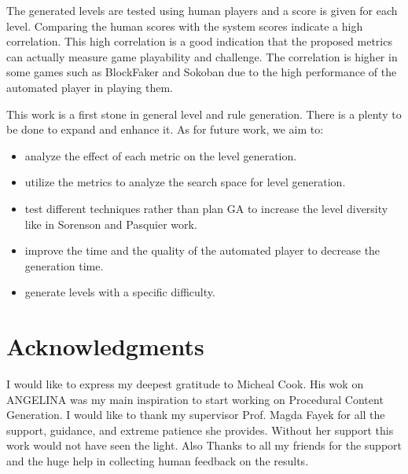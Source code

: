 \documentclass[letterpaper]{article}
\begin{document}
The generated levels are tested using human players and a score is given for each level. Comparing the human scores with the system scores indicate a high correlation. This high correlation is a good indication that the proposed metrics can actually measure game playability and challenge. The correlation is higher in some games such as BlockFaker and Sokoban due to the high performance of the automated player in playing them.\\\par

This work is a first stone in general level and rule generation. There is a plenty to be done to expand and enhance it. As for future work, we aim to:
\begin{itemize}
	\item analyze the effect of each metric on the level generation.
	\item utilize the metrics to analyze the search space for level generation.
	\item test different techniques rather than plan GA to increase the level diversity like in Sorenson and Pasquier work\cite{genericLevelFramework}.
	\item improve the time and the quality of the automated player to decrease the generation time.
	\item generate levels with a specific difficulty.
\end{itemize}

\section{Acknowledgments}
I would like to express my deepest gratitude to Micheal Cook. His wok on ANGELINA was my main inspiration to start working on Procedural Content Generation. I would like to thank my supervisor Prof. Magda Fayek for all the support, guidance, and extreme patience she provides. Without her support this work would not have seen the light. Also Thanks to all my friends for the support and the huge help in collecting human feedback on the results.



\end{document}
